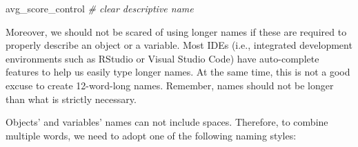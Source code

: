\documentclass[
  11pt,
]{book}
\newenvironment{Shaded}{\begin{snugshade}}{\end{snugshade}}
\newcommand{\CommentTok}[1]{\textcolor[rgb]{0.56,0.35,0.01}{\textit{#1}}}
\newcommand{\NormalTok}[1]{#1}
\newenvironment{code-tex-bad}
  {\begingroup\definecolor{shadecolor}{RGB}{255, 189, 185}}
  {\endgroup}
\newenvironment{code-tex-good}
  {\begingroup\definecolor{shadecolor}{RGB}{224, 240, 227}}
  {\endgroup}
\begin{document}
\begin{itemize}
\begin{code-tex-bad}
  \end{code-tex-bad}

  \begin{code-tex-good}

\begin{Shaded}
\begin{Highlighting}[]
\NormalTok{avg\_score\_control }\CommentTok{\# clear descriptive name}
\end{Highlighting}
\end{Shaded}

  \end{code-tex-good}

  Moreover, we should not be scared of using longer names if these are required to properly describe an object or a variable. Most IDEs (i.e., integrated development environments such as RStudio or Visual Studio Code) have auto-complete features to help us easily type longer names. At the same time, this is not a good excuse to create 12-word-long names. Remember, names should not be longer than what is strictly necessary.
\end{itemize}

Objects' and variables' names can not include spaces. Therefore, to combine multiple words, we need to adopt one of the following naming styles:
\end{document}

